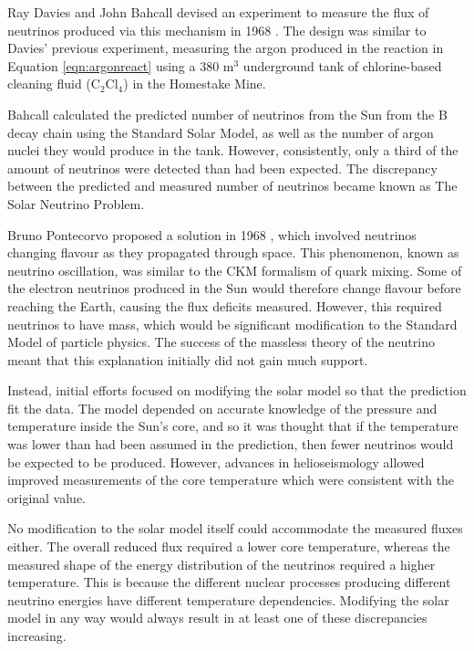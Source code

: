 Ray Davies and John Bahcall devised an experiment to measure the flux of neutrinos produced via this mechanism in 1968 \cite{davis2}. The design was similar to Davies' previous experiment, measuring the argon produced in the reaction in Equation \eqref{eqn:argonreact} using a $380$ m$^3$ underground tank of chlorine-based cleaning fluid (C$_{2}$Cl$_{4}$) in the Homestake Mine.

Bahcall calculated the predicted number of neutrinos from the Sun from the B decay chain using the Standard Solar Model, as well as the number of argon nuclei they would produce in the tank. However, consistently, only a third of the amount of neutrinos were detected than had been expected. The discrepancy between the predicted and measured number of neutrinos became known as The Solar Neutrino Problem.

Bruno Pontecorvo proposed a solution in 1968 \cite{pontecorvo}, which involved neutrinos changing flavour as they propagated through space. This phenomenon, known as neutrino oscillation, was similar to the CKM \cite{CKM} \cite{CKM2} formalism of quark mixing. Some of the electron neutrinos produced in the Sun would therefore change flavour before reaching the Earth, causing the flux deficits measured. However, this required neutrinos to have mass, which would be significant modification to the Standard Model of particle physics. The success of the massless theory of the neutrino meant that this explanation initially did not gain much support.

Instead, initial efforts focused on modifying the solar model so that the prediction fit the data. The model depended on accurate knowledge of the pressure and temperature inside the Sun's core, and so it was thought that if the temperature was lower than had been assumed in the prediction, then fewer neutrinos would be expected to be produced. However, advances in helioseismology allowed improved measurements of the core temperature which were consistent with the original value.

No modification to the solar model itself could accommodate the measured fluxes either. The overall reduced flux required a lower core temperature, whereas the measured shape of the energy distribution of the neutrinos required a higher temperature. This is because the different nuclear processes producing different neutrino energies have different temperature dependencies. Modifying the solar model in any way would always result in at least one of these discrepancies increasing.

